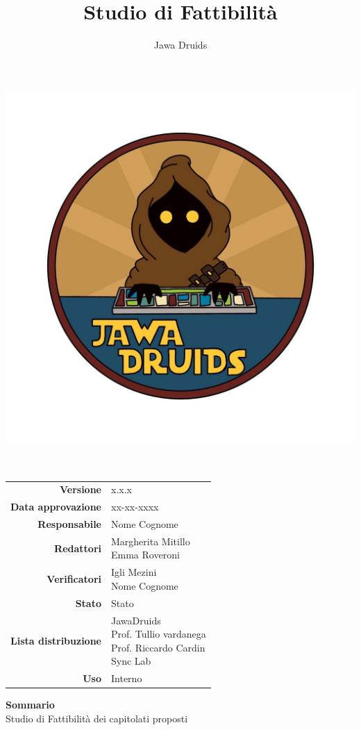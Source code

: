 



	
	\makeatletter
	\begin{titlepage}
		\begin{center}
			\vspace*{-5cm}
			\author{Jawa Druids} 
			\title{Studio di Fattibilità}
			\date{} %
			\includegraphics[width=0.5\linewidth]{../immagini/DRUIDSLOGO.jpg}\\[4ex]
			{\huge \bfseries  \@title }\\[2ex] 
			{\LARGE  \@author}\\[50ex]
			\vspace*{-9cm}
			\begin{table}[H]
				\renewcommand{\arraystretch}{1.4}
				\centering
				\begin{tabular}{r | l}
					\textbf{Versione} & x.x.x \\%
					\textbf{Data approvazione} & xx-xx-xxxx\\
					\textbf{Responsabile} & Nome Cognome\\
					\textbf{Redattori} & \makecell[tl]{Margherita Mitillo \\ Emma Roveroni} \\
					\textbf{Verificatori} & \makecell[tl]{Igli Mezini \\ Nome Cognome} \\
					\textbf{Stato} & Stato\\
					\textbf{Lista distribuzione} & \makecell[tl]{JawaDruids \\ Prof. Tullio vardanega \\ Prof. Riccardo Cardin \\ Sync Lab}\\
					\textbf{Uso} & Interno
				\end{tabular}
			\end{table}
			\vspace{0.1cm}
			\hfill \break
			\fontsize{17}{10}\textbf{Sommario} \\
			\vspace{0.1cm}
			Studio di Fattibilità dei capitolati proposti 
		\end{center}
	\end{titlepage}
	\makeatother
	
